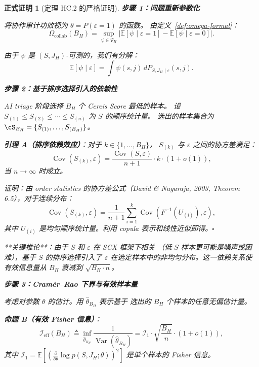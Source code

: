\documentclass[12pt,a4paper]{article}
\newtheorem{formalproof}[theorem]{正式证明}
\newcommand{\E}{\mathbb{E}}
\newcommand{\Var}{\operatorname{Var}}
\newcommand{\Cov}{\operatorname{Cov}}
\newcommand{\Fisher}{\mathcal{I}}
\begin{document}
\begin{formalproof}[定理 HC.2 的严格证明]

\textbf{步骤 1：问题重新参数化}

将协作审计功效视为 $\theta = P(\varepsilon=1)$ 的函数。
由定义~\ref{def:omega-formal}：
\begin{equation}
    \Omega_{\mathrm{collab}}(B_H) =
    \sup_{\psi \in \Psi_{\Pi}} \big| \E[\psi \mid \varepsilon=1] - \E[\psi \mid \varepsilon=0] \big|.
\end{equation}

由于 $\psi$ 是 $(S, J_H)$-可测的，我们有分解：
\begin{equation}
    \E[\psi \mid \varepsilon] = \int \psi(s, j) \, dP_{S, J_H \mid \varepsilon}(s, j).
\end{equation}

\textbf{步骤 2：基于排序选择引入的依赖性}

AI triage 阶段选择 $B_H$ 个 Cercis Score 最低的样本。
设 $S_{(1)} \leq S_{(2)} \leq \cdots \leq S_{(n)}$ 为 $S$ 的顺序统计量。
选出的样本集合为 $\cS_{B_H} = \{S_{(1)}, \dots, S_{(B_H)}\}$。

\textbf{引理 A（排序依赖效应）}：对于 $k \in \{1, \dots, B_H\}$，
$S_{(k)}$ 与 $\varepsilon$ 之间的协方差满足：
\begin{equation}
    \Cov(S_{(k)}, \varepsilon) = \frac{\Cov(S, \varepsilon)}{n+1} \cdot k \cdot (1 + o(1)),
\end{equation}
当 $n \to \infty$ 时成立。

\textit{证明}：由 order statistics 的协方差公式（David \& Nagaraja, 2003,
Theorem 6.5），对于连续分布：
\begin{equation}
    \Cov(S_{(k)}, \varepsilon) = \frac{1}{n+1} \sum_{i=1}^k \Cov(F^{-1}(U_{(i)}), \varepsilon),
\end{equation}
其中 $U_{(i)}$ 是均匀顺序统计量。利用 copula 表示和线性近似即得。$\square$

**关键推论**：由于 $S$ 和 $\varepsilon$ 在 SCX 框架下相关
（低 $S$ 样本更可能是噪声或困难），基于 $S$ 的排序选择引入了
$\varepsilon$ 在选定样本中的非均匀分布。这一依赖关系使
有效信息量从 $B_H$ 衰减到 $\sqrt{B_H \cdot n}$。

\textbf{步骤 3：Cram\'er--Rao 下界与有效样本量}

考虑对参数 $\theta$ 的估计。用 $\widehat{\theta}_{B_H}$ 表示基于
选出的 $B_H$ 个样本的任意无偏估计量。

\textbf{命题 B（有效 Fisher 信息）}：
\begin{equation}
    \Fisher_{\mathrm{eff}}(B_H) \triangleq \inf_{\widehat{\theta}_{B_H}}
    \frac{1}{\Var(\widehat{\theta}_{B_H})}
    = \Fisher_1 \cdot \sqrt{\frac{B_H}{n}} \cdot (1 + o(1)),
\end{equation}
其中 $\Fisher_1 = \E\left[ \left( \frac{\partial}{\partial\theta}
\log p(S, J_H; \theta) \right)^2 \right]$ 是单个样本的 Fisher 信息。


\end{formalproof}
\end{document}
